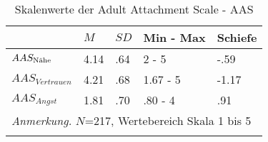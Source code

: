 \begin{table}%
\begin{tabular}{m{6em} m{3em}  m{3em}  m{5em} m{3em}} 
  \hline
  & $M$ & $SD$ & Min - Max & Schiefe\\
  \hline
  $AAS_{\textnormal{Nähe}}$ & 4.14 & .64 & 2 - 5 & -.59\\
  $AAS_{Vertrauen}$ & 4.21 & .68 & 1.67 - 5 & -1.17\\
  $AAS_{Angst}$ & 1.81 & .70 & .80 - 4 & .91 \\
  \hline
  \multicolumn{5}{l}{\textit{Anmerkung.} $N$=217, Wertebereich Skala 1 bis 5}\\
  &&&&\\
\end{tabular}
\caption{Skalenwerte der Adult Attachment Scale - AAS}
\label{table:AppAASDeskriptiv}
\end{table}